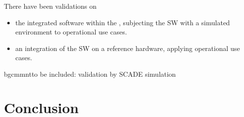 \documentclass{template/openetcs_article}
\begin{document}
There have been validations on
\begin{itemize}
\item the integrated software within the , subjecting the SW with a simulated environment to
  operational use cases.
\item an integration of the SW on a reference hardware, applying
  operational use cases.  
\end{itemize}

bgcmmnt{to be included: validation by SCADE simulation }



\section{Conclusion}
\label{sec:conclusion}









\end{document}
